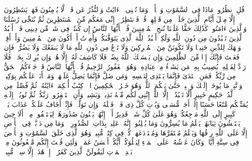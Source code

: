 \startbuffer[\q:10:101]
قُلِ ٱنظُرُوا۟ مَاذَا فِی ٱلسَّمَٰوَٰتِ وَٱلۡأَرۡضِۚ وَمَا تُغۡنِی ٱلۡءَایَٰتُ وَٱلنُّذُرُ عَن قَوۡمࣲ لَّا یُؤۡمِنُونَ%
\stopbuffer
\startbuffer[\q:10:102]
فَهَلۡ یَنتَظِرُونَ إِلَّا مِثۡلَ أَیَّامِ ٱلَّذِینَ خَلَوۡا۟ مِن قَبۡلِهِمۡۚ قُلۡ فَٱنتَظِرُوۤا۟ إِنِّی مَعَكُم مِّنَ ٱلۡمُنتَظِرِینَ%
\stopbuffer
\startbuffer[\q:10:103]
ثُمَّ نُنَجِّی رُسُلَنَا وَٱلَّذِینَ ءَامَنُوا۟ۚ كَذَٰلِكَ حَقًّا عَلَیۡنَا نُنجِ ٱلۡمُؤۡمِنِینَ%
\stopbuffer
\startbuffer[\q:10:104]
قُلۡ یَٰۤأَیُّهَا ٱلنَّاسُ إِن كُنتُمۡ فِی شَكࣲّ مِّن دِینِی فَلَاۤ أَعۡبُدُ ٱلَّذِینَ تَعۡبُدُونَ مِن دُونِ ٱللَّهِ وَلَٰكِنۡ أَعۡبُدُ ٱللَّهَ ٱلَّذِی یَتَوَفَّىٰكُمۡۖ وَأُمِرۡتُ أَنۡ أَكُونَ مِنَ ٱلۡمُؤۡمِنِینَ%
\stopbuffer
\startbuffer[\q:10:105]
وَأَنۡ أَقِمۡ وَجۡهَكَ لِلدِّینِ حَنِیفࣰا وَلَا تَكُونَنَّ مِنَ ٱلۡمُشۡرِكِینَ%
\stopbuffer
\startbuffer[\q:10:106]
وَلَا تَدۡعُ مِن دُونِ ٱللَّهِ مَا لَا یَنفَعُكَ وَلَا یَضُرُّكَۖ فَإِن فَعَلۡتَ فَإِنَّكَ إِذࣰا مِّنَ ٱلظَّٰلِمِینَ%
\stopbuffer
\startbuffer[\q:10:107]
وَإِن یَمۡسَسۡكَ ٱللَّهُ بِضُرࣲّ فَلَا كَاشِفَ لَهُۥۤ إِلَّا هُوَۖ وَإِن یُرِدۡكَ بِخَیۡرࣲ فَلَا رَاۤدَّ لِفَضۡلِهِۦۚ یُصِیبُ بِهِۦ مَن یَشَاۤءُ مِنۡ عِبَادِهِۦۚ وَهُوَ ٱلۡغَفُورُ ٱلرَّحِیمُ%
\stopbuffer
\startbuffer[\q:10:108]
قُلۡ یَٰۤأَیُّهَا ٱلنَّاسُ قَدۡ جَاۤءَكُمُ ٱلۡحَقُّ مِن رَّبِّكُمۡۖ فَمَنِ ٱهۡتَدَىٰ فَإِنَّمَا یَهۡتَدِی لِنَفۡسِهِۦۖ وَمَن ضَلَّ فَإِنَّمَا یَضِلُّ عَلَیۡهَاۖ وَمَاۤ أَنَا۠ عَلَیۡكُم بِوَكِیلࣲ%
\stopbuffer
\startbuffer[\q:10:109]
وَٱتَّبِعۡ مَا یُوحَىٰۤ إِلَیۡكَ وَٱصۡبِرۡ حَتَّىٰ یَحۡكُمَ ٱللَّهُۚ وَهُوَ خَیۡرُ ٱلۡحَٰكِمِینَ%
\stopbuffer
\startbuffer[\q:11:1]
الۤرۚ كِتَٰبٌ أُحۡكِمَتۡ ءَایَٰتُهُۥ ثُمَّ فُصِّلَتۡ مِن لَّدُنۡ حَكِیمٍ خَبِیرٍ%
\stopbuffer
\startbuffer[\q:11:2]
أَلَّا تَعۡبُدُوۤا۟ إِلَّا ٱللَّهَۚ إِنَّنِی لَكُم مِّنۡهُ نَذِیرࣱ وَبَشِیرࣱ%
\stopbuffer
\startbuffer[\q:11:3]
وَأَنِ ٱسۡتَغۡفِرُوا۟ رَبَّكُمۡ ثُمَّ تُوبُوۤا۟ إِلَیۡهِ یُمَتِّعۡكُم مَّتَٰعًا حَسَنًا إِلَىٰۤ أَجَلࣲ مُّسَمࣰّى وَیُؤۡتِ كُلَّ ذِی فَضۡلࣲ فَضۡلَهُۥۖ وَإِن تَوَلَّوۡا۟ فَإِنِّیۤ أَخَافُ عَلَیۡكُمۡ عَذَابَ یَوۡمࣲ كَبِیرٍ%
\stopbuffer
\startbuffer[\q:11:4]
إِلَى ٱللَّهِ مَرۡجِعُكُمۡۖ وَهُوَ عَلَىٰ كُلِّ شَیۡءࣲ قَدِیرٌ%
\stopbuffer
\startbuffer[\q:11:5]
أَلَاۤ إِنَّهُمۡ یَثۡنُونَ صُدُورَهُمۡ لِیَسۡتَخۡفُوا۟ مِنۡهُۚ أَلَا حِینَ یَسۡتَغۡشُونَ ثِیَابَهُمۡ یَعۡلَمُ مَا یُسِرُّونَ وَمَا یُعۡلِنُونَۚ إِنَّهُۥ عَلِیمُۢ بِذَاتِ ٱلصُّدُورِ%
\stopbuffer
\startbuffer[\q:11:6]
۞ وَمَا مِن دَاۤبَّةࣲ فِی ٱلۡأَرۡضِ إِلَّا عَلَى ٱللَّهِ رِزۡقُهَا وَیَعۡلَمُ مُسۡتَقَرَّهَا وَمُسۡتَوۡدَعَهَاۚ كُلࣱّ فِی كِتَٰبࣲ مُّبِینࣲ%
\stopbuffer
\startbuffer[\q:11:7]
وَهُوَ ٱلَّذِی خَلَقَ ٱلسَّمَٰوَٰتِ وَٱلۡأَرۡضَ فِی سِتَّةِ أَیَّامࣲ وَكَانَ عَرۡشُهُۥ عَلَى ٱلۡمَاۤءِ لِیَبۡلُوَكُمۡ أَیُّكُمۡ أَحۡسَنُ عَمَلࣰاۗ وَلَئِن قُلۡتَ إِنَّكُم مَّبۡعُوثُونَ مِنۢ بَعۡدِ ٱلۡمَوۡتِ لَیَقُولَنَّ ٱلَّذِینَ كَفَرُوۤا۟ إِنۡ هَٰذَاۤ إِلَّا سِحۡرࣱ مُّبِینࣱ%
